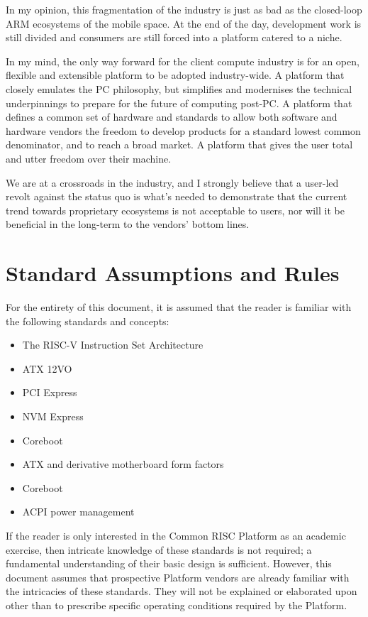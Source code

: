 \documentclass[12pt]{report}
\begin{document}
In my opinion, this fragmentation of the industry is just as bad as the closed-loop ARM ecosystems of the mobile space. At the end
of the day, development work is still divided and consumers are still forced into a platform catered to a niche.

In my mind, the only way forward for the client compute industry is for an open, flexible and extensible platform to be adopted
industry-wide. A platform that closely emulates the PC philosophy, but simplifies and modernises the technical underpinnings to prepare
for the future of computing post-PC. A platform that defines a common set of hardware and standards to allow both software and
hardware vendors the freedom to develop products for a standard lowest common denominator, and to reach a broad market. A platform that
gives the user total and utter freedom over their machine.

We are at a crossroads in the industry, and I strongly believe that a user-led revolt against the status quo is what’s needed to
demonstrate that the current trend towards proprietary ecosystems is not acceptable to users, nor will it be beneficial in the
long-term to the vendors’ bottom lines.
\newpage


\section{Standard Assumptions and Rules}
For the entirety of this document, it is assumed that the reader is familiar with the following standards and concepts:

\begin{itemize}
	\item The RISC-V Instruction Set Architecture
	\item ATX 12VO
	\item PCI Express
	\item NVM Express
	\item Coreboot
	\item ATX and derivative motherboard form factors
	\item Coreboot
	\item ACPI power management
\end{itemize}

If the reader is only interested in the Common RISC Platform as an academic exercise, then intricate knowledge of these
standards is not required; a fundamental understanding of their basic design is sufficient. However, this document
assumes that prospective Platform vendors are already familiar with the intricacies of these standards. They will not
be explained or elaborated upon other than to prescribe specific operating conditions required by the Platform.
\end{document}

